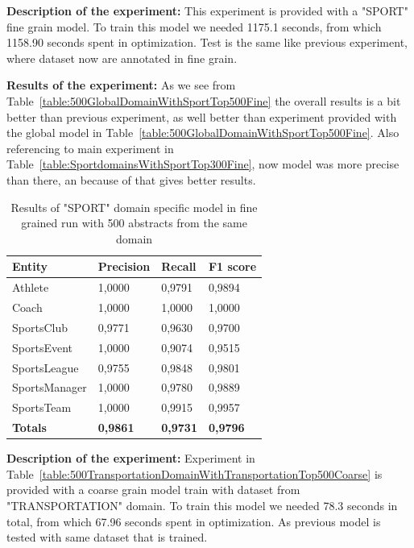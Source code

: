 \documentclass[thesis=M,english]{FITthesis}[2018/05/30]
\begin{document}
	\textbf{Description of the experiment:} This experiment is provided with a "SPORT" fine grain model. To train this model we needed 1175.1 seconds, from which 1158.90 seconds spent in optimization. Test is the same like previous experiment, where dataset now are annotated in fine grain.

	\textbf{Results of the experiment:} As we see from Table~\ref{table:500GlobalDomainWithSportTop500Fine} the overall results is a bit better than previous experiment, as well better than experiment provided with the global model in Table~\ref{table:500GlobalDomainWithSportTop500Fine}. Also referencing to main experiment in Table~\ref{table:SportdomainsWithSportTop300Fine}, now model was more precise than there, an because of that gives better results.

	\begin{table}[H]\centering
		\begin{tabular}{|l|l|l|l|}
			\hline {\textbf{Entity}} & {\textbf{Precision}} & {\textbf{Recall}} & {\textbf{F1 score}}\\\hline
				Athlete & 1,0000 & 0,9791 & 0,9894\\
				Coach & 1,0000 & 1,0000 & 1,0000\\
				SportsClub & 0,9771 & 0,9630 & 0,9700\\
				SportsEvent & 1,0000 & 0,9074 & 0,9515\\
				SportsLeague & 0,9755 & 0,9848 & 0,9801\\
				SportsManager & 1,0000 & 0,9780 & 0,9889\\				
				SportsTeam & 1,0000 & 0,9915 & 0,9957\\\hline
				\textbf{Totals} & \textbf{0,9861} & \textbf{0,9731} & \textbf{0,9796}\\\hline
		\end{tabular}
		\caption{Results of "SPORT" domain specific model in fine grained run with 500 abstracts from the same domain \label{table:500SportDomainWithSportTop500Fine}}
	\end{table}	

	\textbf{Description of the experiment:} Experiment in Table~\ref{table:500TransportationDomainWithTransportationTop500Coarse} is provided with a coarse grain model train with dataset from "TRANSPORTATION" domain. To train this model we needed 78.3 seconds in total, from which 67.96 seconds spent in optimization. As previous model is tested with same dataset that is trained.
\end{document}
